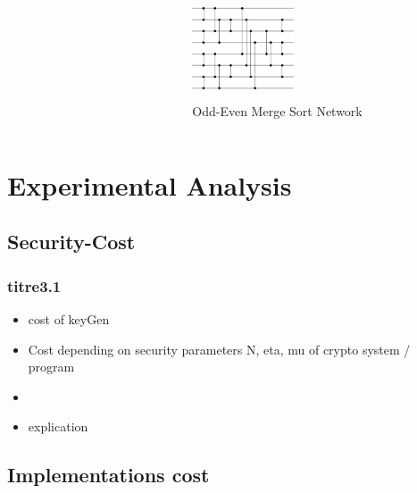 \documentclass{beamer}
\begin{document}
\begin{frame}
\begin{columns}
\begin{column}[c]{3cm}
\begin{figure}
\end{figure}
\end{column}
\begin{column}[c]{3cm}
\begin{figure}
\vspace{-5ex}
\centering
\includegraphics[width=3cm, height=3cm]{networkOdddEven.png} 
\caption{Odd-Even Merge Sort Network } 
\end{figure}
\end{column}
\end{columns}

\end{frame}



\section[Experimental Analysis]{Experimental Analysis}

\subsection{Security-Cost}

\begin{frame} \frametitle{titre3.1}
  \begin{itemize}
  \item cost of keyGen
  \item Cost depending on security parameters N, eta, mu of crypto system / program
  \item {}
  \item explication
  \end{itemize}
\end{frame}

\subsection{Implementations cost}
\end{document}
